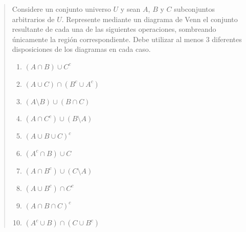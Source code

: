 \documentclass[11pt]{article}
\begin{document}
\begin{quote}
Considere un conjunto universo $U$ y sean $A$, $B$ y $C$ subconjuntos arbitrarios de $U$.
Represente mediante un diagrama de Venn el conjunto resultante de cada una de las siguientes
operaciones, sombreando únicamente la región correspondiente. Debe utilizar al menos 3
diferentes disposiciones de los diagramas en cada caso.

\begin{enumerate}[label=(\alph*),leftmargin=*]
	\item $(A\cap B)\cup C^{c}$
	\item $(A\cup C)\cap(B^{c}\cup A^{c})$
	\item $(A\setminus B)\cup(B\cap C)$
	\item $(A\cap C^{c})\cup(B\setminus A)$
	\item $(A\cup B\cup C)^{c}$
	\item $(A^{c}\cap B)\cup C$
	\item $(A\cap B^{c})\cup(C\setminus A)$
	\item $(A\cup B^{c})\cap C^{c}$
	\item $(A\cap B\cap C)^{c}$
	\item $(A^{c}\cup B)\cap(C\cup B^{c})$
\end{enumerate}
\end{quote}
\end{document}
